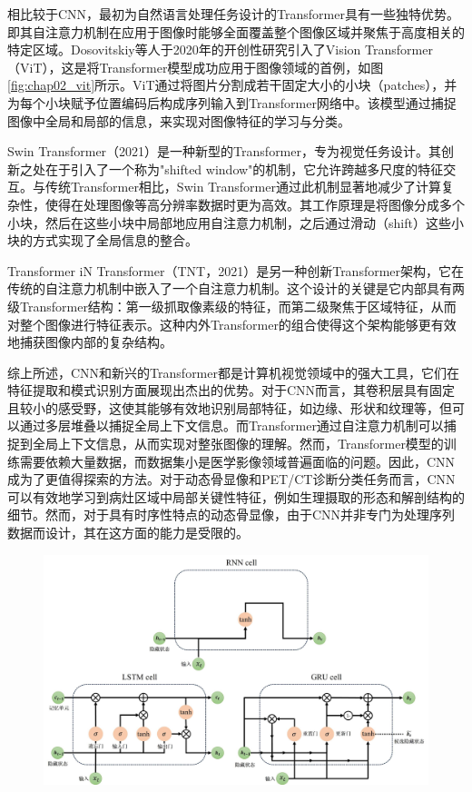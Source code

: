 相比较于CNN，最初为自然语言处理任务设计的Transformer具有一些独特优势。即其自注意力机制在应用于图像时能够全面覆盖整个图像区域并聚焦于高度相关的特定区域。Dosovitskiy等人\cite{dosovitskiy2020image}于2020年的开创性研究引入了Vision Transformer（ViT），这是将Transformer模型成功应用于图像领域的首例，如图\ref{fig:chap02_vit}所示。ViT通过将图片分割成若干固定大小的小块（patches），并为每个小块赋予位置编码后构成序列输入到Transformer网络中。该模型通过捕捉图像中全局和局部的信息，来实现对图像特征的学习与分类。

Swin Transformer\cite{liu2021swin}（2021）是一种新型的Transformer，专为视觉任务设计。其创新之处在于引入了一个称为"shifted window"的机制，它允许跨越多尺度的特征交互。与传统Transformer相比，Swin Transformer通过此机制显著地减少了计算复杂性，使得在处理图像等高分辨率数据时更为高效。其工作原理是将图像分成多个小块，然后在这些小块中局部地应用自注意力机制，之后通过滑动（shift）这些小块的方式实现了全局信息的整合。

Transformer iN Transformer\cite{han2021transformer}（TNT，2021）是另一种创新Transformer架构，它在传统的自注意力机制中嵌入了一个自注意力机制。这个设计的关键是它内部具有两级Transformer结构：第一级抓取像素级的特征，而第二级聚焦于区域特征，从而对整个图像进行特征表示。这种内外Transformer的组合使得这个架构能够更有效地捕获图像内部的复杂结构。

综上所述，CNN和新兴的Transformer都是计算机视觉领域中的强大工具，它们在特征提取和模式识别方面展现出杰出的优势。对于CNN而言，其卷积层具有固定且较小的感受野，这使其能够有效地识别局部特征，如边缘、形状和纹理等，但可以通过多层堆叠以捕捉全局上下文信息。而Transformer通过自注意力机制可以捕捉到全局上下文信息，从而实现对整张图像的理解。然而，Transformer模型的训练需要依赖大量数据，而数据集小是医学影像领域普遍面临的问题。因此，CNN成为了更值得探索的方法。对于动态骨显像和PET/CT诊断分类任务而言，CNN可以有效地学习到病灶区域中局部关键性特征，例如生理摄取的形态和解剖结构的细节。然而，对于具有时序性特点的动态骨显像，由于CNN并非专门为处理序列数据而设计，其在这方面的能力是受限的。

\begin{figure}[htbp]
  \centering
  \includegraphics[width=\textwidth]{figures/chap02_rnn.jpg}
  \label{fig:chap02_rnn}
\end{figure}

